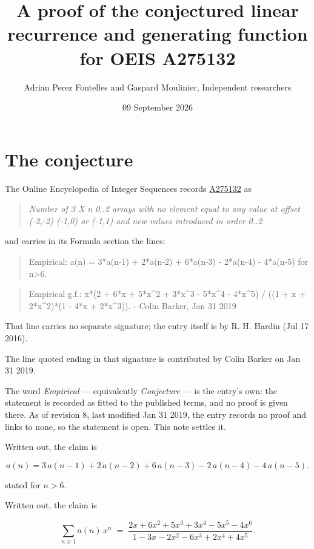 \documentclass[11pt]{article}
\title{A proof of the conjectured linear recurrence and generating function for OEIS A275132}
\author{Adrian Perez Fontelles and Gaspard Moulinier, Independent researchers}
\date{09 September 2026}
\theoremstyle{definition}
\begin{document}
\maketitle
\section{The conjecture}

The Online Encyclopedia of Integer Sequences records \href{https://oeis.org/A275132}{A275132} as

\begin{quote}\itshape Number of 3 X n 0..2 arrays with no element equal to any value at offset (-2,-2) (-1,0) or (-1,1) and new values introduced in order 0..2\end{quote}

and carries in its Formula section the lines:

\begin{quote}\ttfamily Empirical: a(n) = 3*a(n-1) + 2*a(n-2) + 6*a(n-3) - 2*a(n-4) - 4*a(n-5) for n>6.\end{quote}

\begin{quote}\ttfamily Empirical g.f.: x*(2 + 6*x + 5*x\textasciicircum{}2 + 3*x\textasciicircum{}3 - 5*x\textasciicircum{}4 - 4*x\textasciicircum{}5) / ((1 + x + 2*x\textasciicircum{}2)*(1 - 4*x + 2*x\textasciicircum{}3)). - Colin Barker, Jan 31 2019\end{quote}

That line carries no separate signature; the entry itself is by R. H. Hardin (Jul 17 2016).

The line quoted ending in that signature is contributed by Colin Barker on Jan 31 2019.

The word {\itshape Empirical} --- equivalently {\itshape Conjecture} --- is the entry's own: the statement is recorded as fitted to the published terms, and no proof is given there. As of revision 8, last modified Jan 31 2019, the entry records no proof and links to none, so the statement is open. This note settles it.

Written out, the claim is

\[a(n) = 3\,a(n-1) + 2\,a(n-2) + 6\,a(n-3) - 2\,a(n-4) - 4\,a(n-5).\]

stated for $n > 6$.

Written out, the claim is

\[\sum_{n \ge 1} a(n)\,x^n \;=\; \frac{2x + 6x^{2} + 5x^{3} + 3x^{4} - 5x^{5} - 4x^{6}}{1 - 3x - 2x^{2} - 6x^{3} + 2x^{4} + 4x^{5}}.\]
\end{document}
